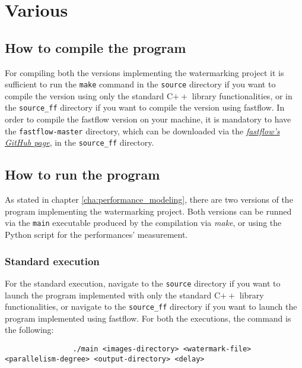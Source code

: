 \chapter{Various} %
\label{cha:various}
    \section{How to compile the program} %
    \label{sec:how_to_compile_the_program}
        For compiling both the versions implementing the watermarking project it is sufficient to run the
        \texttt{make} command in the \texttt{source} directory if you want to compile the version using only the
        standard C$++$ library functionalities, or in the \texttt{source\_ff} directory if you want to compile
        the version using fastflow. In order to compile the fastflow version on your machine, it is mandatory
        to have the \texttt{fastflow-master} directory, which can be downloaded via the
        \href{https://github.com/fastflow/fastflow}{\textit{fastflow's GitHub page}}, in the \texttt{source\_ff}
        directory.
    \section{How to run the program} %
    \label{sec:how_to_run_the_program}
        As stated in chapter \ref{cha:performance_modeling}, there are two versions of the program implementing
        the watermarking project. Both versions can be runned via the \texttt{main} executable produced by the
        compilation via \textit{make}, or using the Python script for the performances' measurement.
        \subsection{Standard execution} %
        \label{sub:standard_execution}
            For the standard execution, navigate to the \texttt{source} directory if you want to launch the
            program implemented with only the standard C$++$ library functionalities, or navigate to the
            \texttt{source\_ff} directory if you want to launch the program implemented using fastflow.
            For both the executions, the command is the following:

            \begin{verbatim}
                ./main <images-directory> <watermark-file> <parallelism-degree> <output-directory> <delay>
            \end{verbatim}

